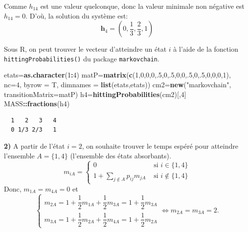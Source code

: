 \documentclass[
]{book}
\newenvironment{Shaded}{\begin{snugshade}}{\end{snugshade}}
\newcommand{\DataTypeTok}[1]{\textcolor[rgb]{0.13,0.29,0.53}{#1}}
\newcommand{\DecValTok}[1]{\textcolor[rgb]{0.00,0.00,0.81}{#1}}
\newcommand{\KeywordTok}[1]{\textcolor[rgb]{0.13,0.29,0.53}{\textbf{#1}}}
\newcommand{\NormalTok}[1]{#1}
\newcommand{\OperatorTok}[1]{\textcolor[rgb]{0.81,0.36,0.00}{\textbf{#1}}}
\newcommand{\StringTok}[1]{\textcolor[rgb]{0.31,0.60,0.02}{#1}}
\theoremstyle{definition}
\theoremstyle{definition}
\theoremstyle{definition}
\theoremstyle{remark}
\begin{document}
Comme \(h_{14}\) est une valeur quelconque, donc la valeur minimale non négative est \(h_{14}=0\). D'où, la solution du système est:
\[\mathbf{h}_4=\left(0,\frac{1}{3}, \frac{2}{3}, 1 \right) \]

Sous R, on peut trouver le vecteur d'atteindre un état \(i\) à l'aide de la fonction \texttt{hittingProbabilities()} du package \texttt{markovchain}.

\begin{Shaded}
\begin{Highlighting}[]
\NormalTok{etats=}\KeywordTok{as.character}\NormalTok{(}\DecValTok{1}\OperatorTok{:}\DecValTok{4}\NormalTok{)}
\NormalTok{matP=}\KeywordTok{matrix}\NormalTok{(}\KeywordTok{c}\NormalTok{(}\DecValTok{1}\NormalTok{,}\DecValTok{0}\NormalTok{,}\DecValTok{0}\NormalTok{,}\DecValTok{0}\NormalTok{,.}\DecValTok{5}\NormalTok{,}\DecValTok{0}\NormalTok{,.}\DecValTok{5}\NormalTok{,}\DecValTok{0}\NormalTok{,}\DecValTok{0}\NormalTok{,.}\DecValTok{5}\NormalTok{,}\DecValTok{0}\NormalTok{,.}\DecValTok{5}\NormalTok{,}\DecValTok{0}\NormalTok{,}\DecValTok{0}\NormalTok{,}\DecValTok{0}\NormalTok{,}\DecValTok{1}\NormalTok{), }\DataTypeTok{nc=}\DecValTok{4}\NormalTok{,}
            \DataTypeTok{byrow =}\NormalTok{ T, }\DataTypeTok{dimnames =} \KeywordTok{list}\NormalTok{(etats,etats))}
\NormalTok{cm2=}\KeywordTok{new}\NormalTok{(}\StringTok{"markovchain"}\NormalTok{, }\DataTypeTok{transitionMatrix=}\NormalTok{matP)}
\NormalTok{h4=}\KeywordTok{hittingProbabilities}\NormalTok{(cm2)[,}\DecValTok{4}\NormalTok{]}
\NormalTok{MASS}\OperatorTok{::}\KeywordTok{fractions}\NormalTok{(h4)}
\end{Highlighting}
\end{Shaded}

\begin{verbatim}
  1   2   3   4 
  0 1/3 2/3   1 
\end{verbatim}

\textbf{2)} A partir de l'état \(i = 2\), on souhaite trouver le temps espéré pour atteindre l'ensemble \(A = \{1, 4\}\) (l'ensemble des états absorbants).
\[
m_{iA}=\left\{
\begin{array}{ll}
0 & \text{ si } i \in \{1,4\}\\
1+\displaystyle \sum_{j \notin A}p_{ij}m_{jA} & \text{ si } i \notin \{1,4\}
\end{array}
\right.
\]
Donc, \(m_{1A}=m_{4A}=0\) et
\[
\left\{
\begin{array}{l}m_{2A}= 1+\dfrac{1}{2}m_{1A}+\dfrac{1}{2}m_{3A}=1+\dfrac{1}{2}m_{3A}
\\
m_{3A}= 1+\dfrac{1}{2}m_{2A}+\dfrac{1}{2}m_{4A}=1+\dfrac{1}{2}m_{2A}
\end{array}
\right. \Longleftrightarrow m_{2A}=m_{3A}=2.
\]
\end{document}
